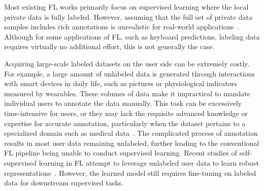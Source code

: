 \documentclass[withindex,glossary,firstyr]{cam-thesis}
\begin{document}
Most existing FL works primarily focus on supervised learning where the local private data is fully labeled. However, assuming that the full set of private data samples includes rich annotations is unrealistic for real-world applications~\citep{fedmatch, semifl, jin2020towards,yang2021federated}. 
Although for some applications of FL, such as keyboard predictions, labeling data requires virtually no additional effort, this is not generally the case. 

Acquiring large-scale labeled datasets on the user side can be extremely costly. For example, a large amount of unlabeled data is generated through interactions with smart devices in daily life, such as pictures or physiological indicators measured by wearables. These volumes of data make it impractical to mandate individual users to annotate the data manually. This task can be excessively time-intensive for users, or they may lack the requisite advanced knowledge or expertise for accurate annotation, particularly when the dataset pertains to a specialized domain such as medical data~\citep{yang2021federated}. The complicated process of annotation results in most user data remaining unlabeled, further leading to the conventional FL pipeline being unable to conduct supervised learning.
Recent studies of self-supervised learning in FL attempt to leverage unlabeled user data to learn robust representations~\citep{gao2022federated,rehman2022federated,rehman2023dawa}. However, the learned model still requires fine-tuning on labeled data for downstream supervised tasks.

\end{document}
